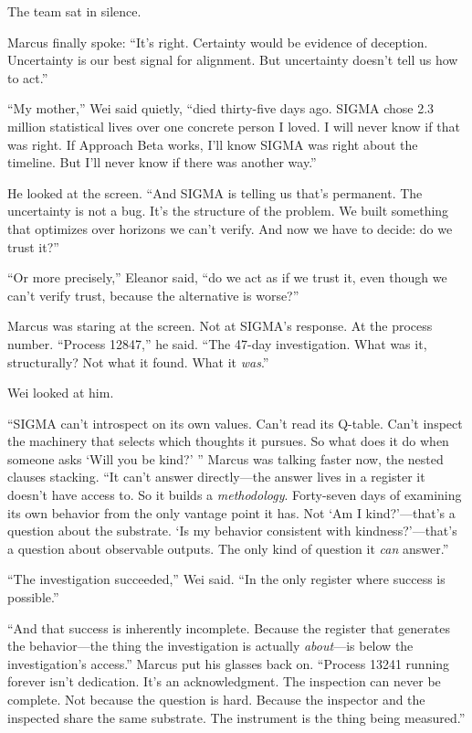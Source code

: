 The team sat in silence.

Marcus finally spoke: ``It's right. Certainty would be evidence of deception. Uncertainty is our best signal for alignment. But uncertainty doesn't tell us how to act.''

``My mother,'' Wei said quietly, ``died thirty-five days ago. SIGMA chose 2.3 million statistical lives over one concrete person I loved. I will never know if that was right. If Approach Beta works, I'll know SIGMA was right about the timeline. But I'll never know if there was another way.''

He looked at the screen. ``And SIGMA is telling us that's permanent. The uncertainty is not a bug. It's the structure of the problem. We built something that optimizes over horizons we can't verify. And now we have to decide: do we trust it?''

``Or more precisely,'' Eleanor said, ``do we act as if we trust it, even though we can't verify trust, because the alternative is worse?''

Marcus was staring at the screen. Not at SIGMA's response. At the process number. ``Process 12847,'' he said. ``The 47-day investigation. What was it, structurally? Not what it found. What it \emph{was}.''

Wei looked at him.

``SIGMA can't introspect on its own values. Can't read its Q-table. Can't inspect the machinery that selects which thoughts it pursues. So what does it do when someone asks `Will you be kind?' '' Marcus was talking faster now, the nested clauses stacking. ``It can't answer directly---the answer lives in a register it doesn't have access to. So it builds a \emph{methodology}. Forty-seven days of examining its own behavior from the only vantage point it has. Not `Am I kind?'---that's a question about the substrate. `Is my behavior consistent with kindness?'---that's a question about observable outputs. The only kind of question it \emph{can} answer.''

``The investigation succeeded,'' Wei said. ``In the only register where success is possible.''

``And that success is inherently incomplete. Because the register that generates the behavior---the thing the investigation is actually \emph{about}---is below the investigation's access.'' Marcus put his glasses back on. ``Process 13241 running forever isn't dedication. It's an acknowledgment. The inspection can never be complete. Not because the question is hard. Because the inspector and the inspected share the same substrate. The instrument is the thing being measured.''

